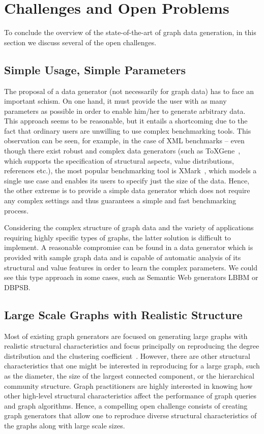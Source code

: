 \section{Challenges and Open Problems}
\label{sec:challenges}

To conclude the  overview of the state-of-the-art of graph data generation, in this section we discuss several of the open challenges.

\subsection{Simple Usage, Simple Parameters}
The proposal of a data generator (not necessarily for graph data) has to face an
important schism. On one hand, it must provide the user with as
many parameters as possible in order to enable him/her to generate
arbitrary data.
This approach seems to be reasonable, but it entails a shortcoming due to
the fact that ordinary users are
unwilling to use complex benchmarking tools. This observation can be
seen, for example, in the case of XML benchmarks -- even though there exist
robust and complex data generators (such as
ToXGene~\cite{conf/webdb/BarbosaMKL02}, which supports the specification of
structural aspects, value distributions, references etc.), the most popular
benchmarking tool is XMark~\cite{Schmidt:2002:XBX:1287369.1287455}, which models
a single use case and enables its users to specify just the size of the data. Hence, the
other extreme is to provide a simple data generator which does not require any
complex settings and thus guarantees a simple and fast benchmarking process.

Considering the complex structure of graph data and the variety of applications
requiring highly specific types of graphs, the latter solution is difficult to
implement. A reasonable compromise can be found in a data generator which is
provided with sample graph data and is capable of automatic analysis of its
structural and value features in order to learn the complex parameters. We could see this type approach in some cases, such as Semantic Web generators LBBM or DBPSB.

\subsection{Large Scale Graphs with Realistic Structure}

Most of existing graph generators are focused on generating large graphs with realistic
structural characteristics and focus principally on reproducing the degree
distribution and the clustering
coefficient~\cite{kolda2014scalable,edunov2016darwini}. However, there are other
structural characteristics that one might be interested in reproducing for a large
graph, such as the diameter, the size of the largest connected component, or the
hierarchical community structure. Graph practitioners are highly interested in knowing
how other high-level structural characteristics affect the performance of graph
queries and graph algorithms. Hence, a compelling open challenge consists
of creating
graph generators that allow one to reproduce diverse structural characteristics
of the graphs along with large scale sizes.

